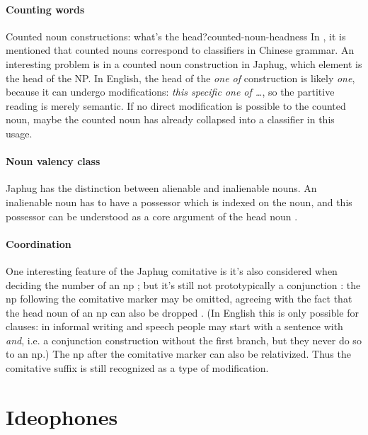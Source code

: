 \documentclass[a4paper, oneside, 12pt]{report}
\newcommand*{\citepage}[1]{p.~{#1}}
\newcommand{\form}[1]{\emph{#1}}
\begin{document}
\paragraph*{Counting words}

\begin{todobox}{Counted noun constructions: what's the head?}{counted-noun-headness}
    In \citet[\citepage{10}]{jacques2021grammar},
    it is mentioned that counted nouns correspond to classifiers in Chinese grammar.
    An interesting problem is in a counted noun construction in Japhug,
    which element is the head of the NP.
    In English, the head of the \form{one of} construction is likely \form{one},
    because it can undergo modifications:
    \form{this specific one of \dots},
    so the partitive reading is merely semantic.
    If no direct modification is possible to the counted noun,
    maybe the counted noun has already collapsed into a classifier in this usage.
\end{todobox}

\paragraph*{Noun valency class}
Japhug has the distinction between alienable and inalienable nouns.
An inalienable noun has to have a possessor
which is indexed on the noun,
and this possessor can be understood as a core argument of the head noun
\citep[\citepage{116}]{jacques2021grammar}.

\paragraph*{Coordination}
One interesting feature of the Japhug comitative 
is it's also considered when deciding the number of an \acs{np}
\citep[\citepage{332}]{jacques2021grammar};
but it's still not prototypically a conjunction \citep[\citepage{420}]{jacques2021grammar}:
the \acs{np} following the comitative marker 
may be omitted, 
agreeing with the fact 
that the head noun of an \acs{np}
can also be dropped \citep[\citepage{425}]{jacques2021grammar}.
(In English this is only possible for clauses:
in informal writing and speech people may start with a sentence with \form{and},
i.e. a conjunction construction 
without the first branch,
but they never do so to an \acs{np}.)
The \acs{np} after the comitative marker can also be relativized.
Thus the comitative suffix is still recognized as a type of 
modification.

\section{Ideophones}
\end{document}
